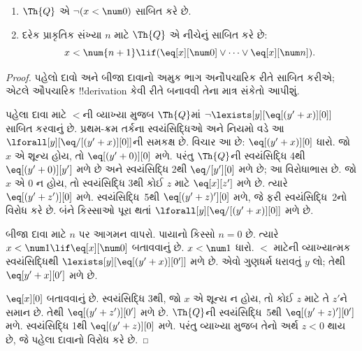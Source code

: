 \documentclass[../../../include/open-logic-section]{subfiles}
\begin{document}
\begin{lem}
\begin{enumerate}
\item $\Th{Q}$ એ $\lnot (x < \num 0)$ સાબિત કરે છે.
\item દરેક પ્રાકૃતિક સંખ્યા $n$ માટે $\Th{Q}$ એ
નીચેનું સાબિત કરે છે:
\[
x < \num {n+1} \lif (\eq[x][\num 0] \lor \dots \lor \eq[x][\num n]).
\]
\end{enumerate}
\end{lem}

\begin{proof}
પહેલો દાવો અને બીજા દાવાનો અમુક ભાગ અનૌપચારિક રીતે
સાબિત કરીએ; એટલે ઔપચારિક !!{derivation} કેવી રીતે
બનાવવી તેના માત્ર સંકેતો આપીશું.

પહેલા દાવા માટે $<$ની વ્યાખ્યા મુજબ $\Th{Q}$માં
$\lnot \lexists[y][\eq[(y'+x)][0]]$ સાબિત કરવાનું છે.
પ્રથમ-ક્રમ તર્કના સ્વયંસિદ્ધિઓ અને નિયમો વડે આ
$\lforall[y][\eq/[(y' + x)][0]]$ની સમકક્ષ છે.
વિચાર આ છે: $\eq[(y'+x)][0]$ ધારો. જો $x$ એ
શૂન્ય હોય, તો $\eq[(y' + 0)][0]$ મળે. પરંતુ
$\Th{Q}$ની સ્વયંસિદ્ધિ 4થી $\eq[(y' + 0)][y']$
મળે છે અને સ્વયંસિદ્ધિ 2થી $\eq/[y'][0]$
મળે છે; આ વિરોધાભાસ છે. જો $x$ એ $0$
ન હોય, તો સ્વયંસિદ્ધિ 3થી કોઈ $z$ માટે
$\eq[x][z']$ મળે છે. ત્યારે
$\eq[(y' + z')][0]$ મળે. સ્વયંસિદ્ધિ~5થી
$\eq[(y' + z)'][0]$ મળે, જે ફરી
સ્વયંસિદ્ધિ~2નો વિરોધ કરે છે. બંને કિસ્સાઓ
પૂરા થતાં $\lforall[y][\eq/[(y' +x)][0]]$ મળે છે.


બીજા દાવા માટે $n$ પર આગમન વાપરો. પાયાનો
કિસ્સો $n =0$ છે. ત્યારે
$x < \num 1 \lif \eq[x][\num 0]$ બતાવવાનું છે.
$x < \num 1$ ધારો. $<$ માટેની વ્યાખ્યાત્મક
સ્વયંસિદ્ધિથી $\lexists[y][\eq[(y'+x)][0']]$
મળે છે. એવો ગુણધર્મ ધરાવતું $y$ લો;
તેથી $\eq[y'+x][0']$ મળે છે.

$\eq[x][0]$ બતાવવાનું છે. સ્વયંસિદ્ધિ 3થી,
જો $x$ એ શૂન્ય ન હોય, તો કોઈ $z$ માટે તે
$z'$ને સમાન છે. તેથી $\eq[(y' + z')][0']$
મળે છે. $\Th{Q}$ની સ્વયંસિદ્ધિ~5થી
$\eq[(y'+z)'][0']$ મળે. સ્વયંસિદ્ધિ 1થી
$\eq[(y' + z)][0]$ મળે. પરંતુ વ્યાખ્યા મુજબ
તેનો અર્થ $z < 0$ થાય છે, જે પહેલા દાવાનો
વિરોધ કરે છે.

\end{proof}
\end{document}
